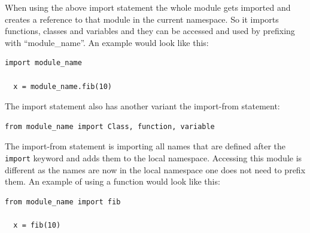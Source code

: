 When using the above import statement the whole module gets imported and creates a reference to that module in the current namespace.
So it imports functions, classes and variables and they can be accessed and used by prefixing with ``module\_name''.
An example would look like this:

\begin{lstlisting}[style=python, caption={Import from statement.}, label={import:from}]
  import module_name

  x = module_name.fib(10)
\end{lstlisting}

The import statement also has another variant the import-from statement:

\begin{lstlisting}[style=python, caption={Import from statement.}, label={import:from}]
  from module_name import Class, function, variable
\end{lstlisting}

The import-from statement is importing all names that are defined after the \texttt{import} keyword and adds them to the local namespace.
Accessing this module is different as the names are now in the local namespace one does not need to prefix them.
An example of using a function would look like this:

\begin{lstlisting}[style=python, caption={Import from statement.}, label={import:from}]
  from module_name import fib

  x = fib(10)
\end{lstlisting}
